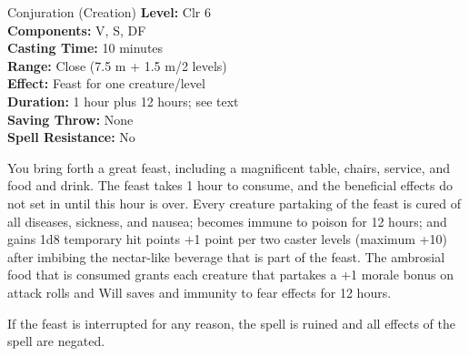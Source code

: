 {Conjuration (Creation)}
{
	\textbf{Level:}
	Clr 6\\
	\textbf{Components:}
	V, S, DF\\
	\textbf{Casting Time:}
	10 minutes\\
	\textbf{Range:}
	Close (7.5 m + 1.5 m/2 levels)\\
	\textbf{Effect:}
	Feast for one creature/level\\
	\textbf{Duration:}
	1 hour plus 12 hours; see text\\
	\textbf{Saving Throw:}
	None\\
	\textbf{Spell Resistance:}
	No\\
}
{
	You bring forth a great feast, including a magnificent table, chairs, service, and food and drink. The feast takes 1 hour to consume, and the beneficial effects do not set in until this hour is over. Every creature partaking of the feast is cured of all diseases, sickness, and nausea; becomes immune to poison for 12 hours; and gains 1d8 temporary hit points +1 point per two caster levels (maximum +10) after imbibing the nectar-like beverage that is part of the feast. The ambrosial food that is consumed grants each creature that partakes a +1 morale bonus on attack rolls and Will saves and immunity to fear effects for 12 hours.

	If the feast is interrupted for any reason, the spell is ruined and all effects of the spell are negated.

}

